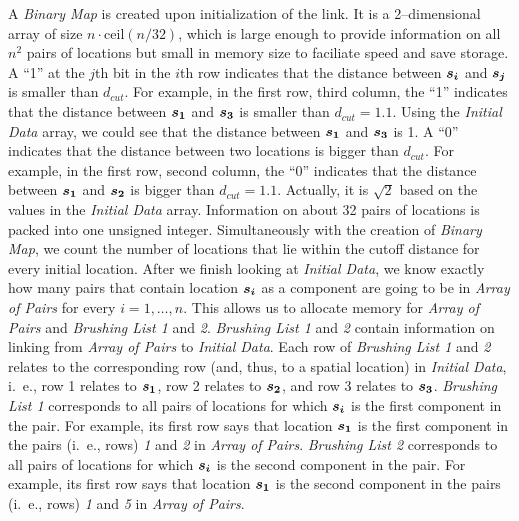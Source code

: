 A {\it Binary Map} is
created upon initialization of the link.  It is a 2--dimensional array
of size $n \cdot \mbox{ceil}(n/32)$, which is large enough to provide
information on all $n^2$ pairs of locations but small
in memory size to faciliate speed and save storage.
 A ``1'' at the $j$th bit in the
$i$th row indicates that the distance between $\mbox{\boldmath$s_i$}$
and $\mbox{\boldmath$s_j$}$ is smaller than $d_{cut}$.
For example, in the first row, third column, the ``1'' indicates
that the distance between 
$\mbox{\boldmath$s_1$}$ and $\mbox{\boldmath$s_3$}$ is smaller than
$d_{cut} = 1.1$. Using the {\it Initial Data} array, we could see that the
distance between $\mbox{\boldmath$s_1$}$ and $\mbox{\boldmath$s_3$}$ is 1.
A ``0'' indicates that the distance between 
two locations is bigger than $d_{cut}$.
For example, in the first row, second column, the ``0''
indicates that the distance between $\mbox{\boldmath$s_1$}$ and
$\mbox{\boldmath$s_2$}$ is bigger than $d_{cut} = 1.1$. Actually, it is 
$\sqrt{2}$ based on the values in the {\it Initial Data} array.
Information on about 32 pairs of locations is
packed into one unsigned integer.  Simultaneously with the creation of
{\it Binary Map}, we count the number of locations that lie within the
cutoff distance for every initial location.  After we finish looking at
{\it Initial Data}, we know exactly how many pairs that contain location
$\mbox{\boldmath$s_i$}$ as a component
are going to be in {\it Array of Pairs} for
every $i=1,\ldots,n$. This allows us to allocate memory for {\it Array
of Pairs} and {\it Brushing List 1} and {\it 2}. 
{\it Brushing List 1} and {\it 2} contain information on linking from
{\it Array of Pairs} to {\it Initial Data}. Each row 
of {\it Brushing List 1} and {\it 2} relates
to the corresponding row (and, thus, to a spatial location) in 
{\it Initial Data}, i.~e., row 1 relates to $\mbox{\boldmath$s_1$}$,
row 2 relates to $\mbox{\boldmath$s_2$}$, and
row 3 relates to $\mbox{\boldmath$s_3$}$.
{\it Brushing List 1} corresponds to all pairs of locations
for which $\mbox{\boldmath$s_i$}$ is the
first component in the pair. For example, its first row says that
location $\mbox{\boldmath$s_1$}$ is the first component in the pairs
(i.~e., rows) {\it 1} and {\it 2} in {\it Array of Pairs}.
{\it Brushing List 2} corresponds to all pairs of
locations for which $\mbox{\boldmath$s_i$}$ is the second component in the
pair. For example, its first row says that
location $\mbox{\boldmath$s_1$}$ is the second component in the pairs
(i.~e., rows) {\it 1} and {\it 5} in {\it Array of Pairs}.

